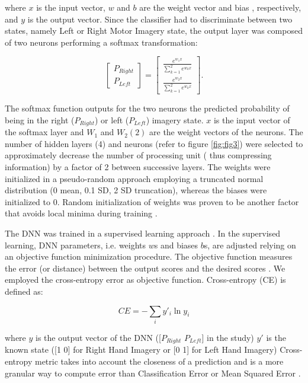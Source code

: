 \documentclass[12pt ]{iopart}
\begin{document}
where $x$ is the input vector, $w$ and $b$ are the weight vector and bias , respectively, and $y$ is the output vector.
Since the classifier had to discriminate between two states, namely Left or Right Motor Imagery state, the output layer was composed of two neurons performing a softmax transformation:

\begin{equation}
\begin{bmatrix}
P_{Right}\\
P_{Left}
\end{bmatrix}
=
\begin{bmatrix}
\frac{e^{w_1x}}{\sum\limits_{k=1}^2 e^{w_kx}}\\
\frac{e^{w_2x}}{\sum\limits_{k=1}^2 e^{w_kx}}
\end{bmatrix}
.
\end{equation}

The softmax function outputs for the two neurons  the predicted probability of being in the right ($P_{Right}$) or left ($P_{Left}$) imagery state. 
$x$ is the input vector of the softmax layer and $W_{1}$ and $W_2(2)$ are the weight vectors of the neurons.
The number of hidden layers (4) and neurons (refer to figure \ref{fig:fig3}) were selected to approximately decrease the number of processing unit ( thus compressing information) by a factor of 2 between successive layers. 
The weights were initialized in a pseudo-random approach employing a truncated normal distribution (0 mean, 0.1 SD, 2 SD truncation), whereas the biases were initialized to 0. Random initialization of weights was proven to be another factor that avoids local minima during training \parencite{sutskever2013importance}.

The DNN was trained in a supervised learning approach \parencite{hastie2009overview}.
In the supervised learning, DNN parameters, i.e. weights $w$s and biases $b$s, are adjusted relying on an objective function minimization procedure. The objective function measures the error (or distance) between the output scores and the desired scores . We employed the cross-entropy error as objective function.
Cross-entropy (CE) is defined as:

\begin{equation}
CE=
-\sum\limits_i y'_{i}\ln y_{i}
\end{equation}

where $y$ is the output vector of the DNN ([$P_{Right}$  $P_{Left}$] in the study) $y'$ is the known state ([1 0] for Right Hand Imagery or [0 1] for Left Hand Imagery)
 Cross-entropy metric takes into account the closeness of a prediction and is a more granular way to compute error than Classification Error or Mean Squared Error \parencite{murphy2012machine}.
 
\end{document}
